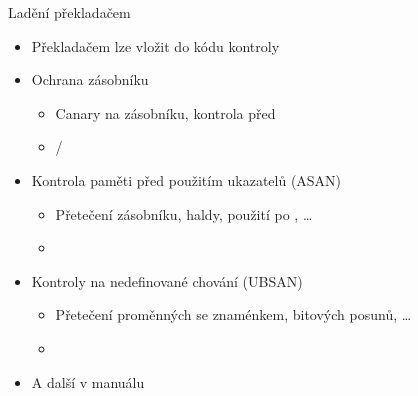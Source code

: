 




\begin{frame}{Ladění překladačem}

  \begin{itemize}
    \item Překladačem lze vložit do kódu kontroly

    \pause

    \item Ochrana zásobníku
    \begin{itemize}
      \item Canary na zásobníku, kontrola před 

      \pause

      \item {}/
    \end{itemize}

    \pause

    \item Kontrola paměti před použitím ukazatelů (ASAN)
    \begin{itemize}
      \item Přetečení zásobníku, haldy, použití po , \dots

      \pause

      \item {}
    \end{itemize}

    \pause

    \item Kontroly na nedefinované chování (UBSAN)
    \begin{itemize}
      \item Přetečení proměnných se znaménkem, bitových posunů, \dots

      \pause

      \item {}
    \end{itemize}

    \pause

    \item A další v manuálu 
  \end{itemize}

\end{frame}

